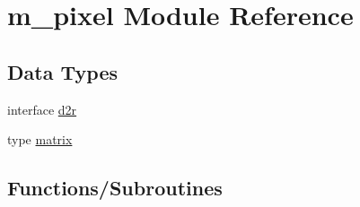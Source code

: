 \hypertarget{namespacem__pixel}{}\section{m\+\_\+pixel Module Reference}
\label{namespacem__pixel}
\subsection*{Data Types}
\begin{DoxyCompactItemize}
\item 
interface \mbox{\hyperlink{interfacem__pixel_1_1d2r}{d2r}}
\item 
type \mbox{\hyperlink{structm__pixel_1_1matrix}{matrix}}
\end{DoxyCompactItemize}
\subsection*{Functions/\+Subroutines}
